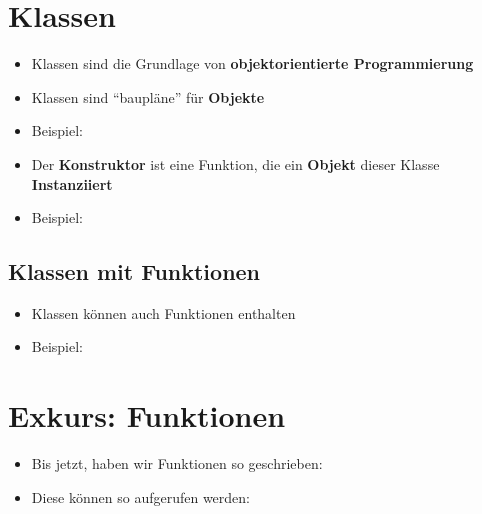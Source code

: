     \section{Klassen}
    \begin{frame}[c]
        \slidehead
        \begin{itemize}
            [<+->]
            \item Klassen sind die Grundlage von \textbf{objektorientierte Programmierung}
            \item Klassen sind \enquote{baupläne} für \textbf{Objekte}
            \item Beispiel: 
            \item Der \textbf{Konstruktor} ist eine Funktion, die ein \textbf{Objekt} dieser Klasse \textbf{Instanziiert}
            \item Beispiel: 
        \end{itemize}
    \end{frame}

    \subsection{Klassen mit Funktionen}\label{subsec:klassen-mit-funktionen}
    \begin{frame}[c]
        \slidehead
        \begin{itemize}
            [<+->]
            \item Klassen können auch Funktionen enthalten
            \item Beispiel: 
        \end{itemize}
    \end{frame}


    \section{Exkurs: Funktionen}\label{sec:exkurs:-funktionen}
    \begin{frame}
        \slidehead
        \vspace{-1.5em}
        \begin{itemize}
            [<+->]
            \item Bis jetzt, haben wir Funktionen so geschrieben:
            \item Diese können so aufgerufen werden:
        \end{itemize}
    \end{frame}

